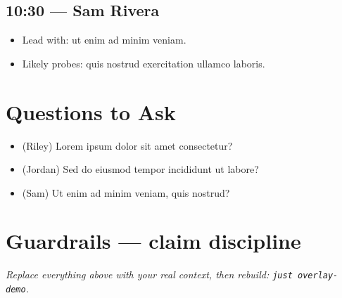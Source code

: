 \subsection{10:30 — Sam Rivera}
\begin{itemize}
  \item Lead with: ut enim ad minim veniam.
  \item Likely probes: quis nostrud exercitation ullamco laboris.
\end{itemize}

\section{Questions to Ask}
\begin{itemize}
  \item (Riley) Lorem ipsum dolor sit amet consectetur?
  \item (Jordan) Sed do eiusmod tempor incididunt ut labore?
  \item (Sam) Ut enim ad minim veniam, quis nostrud?
\end{itemize}

\section{Guardrails — claim discipline}

\begin{itemize}
\end{itemize}

\vspace{0.5em}
\begin{center}\small\itshape\color{muted}
Replace everything above with your real context, then rebuild: \texttt{just overlay-demo}.
\end{center}
